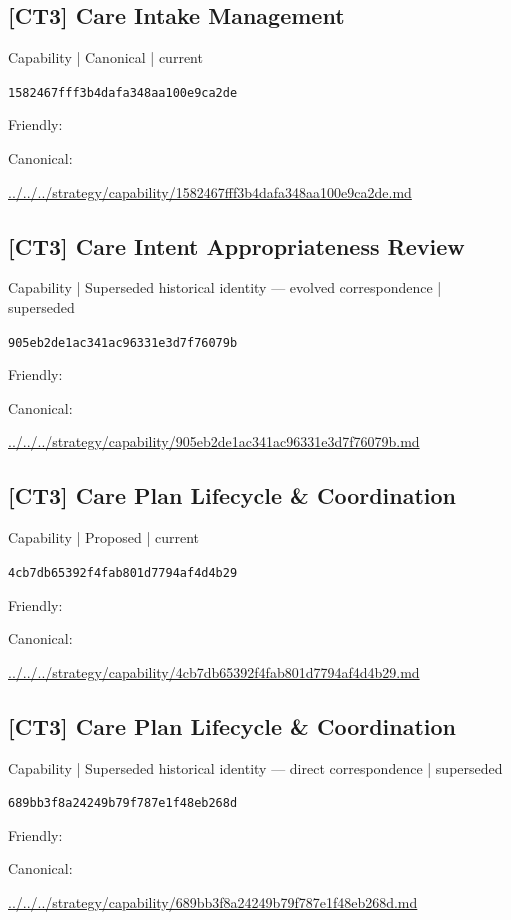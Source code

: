 \documentclass[10pt,a4paper]{article}
\begin{document}
\subsection*{[CT3] Care Intake Management}
{\small Capability | Canonical | current}\par
\texttt{1582467fff3b4dafa348aa100e9ca2de}\par
Friendly: \par
Canonical: \par
{\footnotesize\url{../../../strategy/capability/1582467fff3b4dafa348aa100e9ca2de.md}}\par
\subsection*{[CT3] Care Intent Appropriateness Review}
{\small Capability | Superseded historical identity — evolved correspondence | superseded}\par
\texttt{905eb2de1ac341ac96331e3d7f76079b}\par
Friendly: \par
Canonical: \par
{\footnotesize\url{../../../strategy/capability/905eb2de1ac341ac96331e3d7f76079b.md}}\par
\subsection*{[CT3] Care Plan Lifecycle \& Coordination}
{\small Capability | Proposed | current}\par
\texttt{4cb7db65392f4fab801d7794af4d4b29}\par
Friendly: \par
Canonical: \par
{\footnotesize\url{../../../strategy/capability/4cb7db65392f4fab801d7794af4d4b29.md}}\par
\subsection*{[CT3] Care Plan Lifecycle \& Coordination}
{\small Capability | Superseded historical identity — direct correspondence | superseded}\par
\texttt{689bb3f8a24249b79f787e1f48eb268d}\par
Friendly: \par
Canonical: \par
{\footnotesize\url{../../../strategy/capability/689bb3f8a24249b79f787e1f48eb268d.md}}\par
\end{document}
